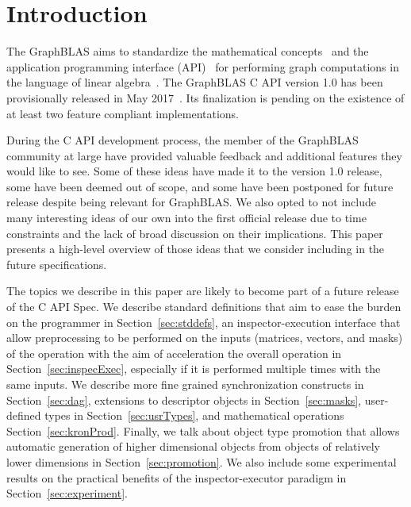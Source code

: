 %
%
\section{Introduction}
\label{sec:intro}
The GraphBLAS aims to standardize the mathematical concepts~\cite{mathgraphblas16} and the application programming interface (API)~\cite{graphblas_capi_17} for performing graph computations in the language of linear algebra~\cite{kepner2011graph}. The GraphBLAS C API version 1.0 has been provisionally released in May 2017~\cite{graphblasapi}. Its finalization is pending on the existence of at least two feature compliant implementations. 

During the C API development process, the member of the GraphBLAS community at large have provided valuable feedback and additional features they would like to see. Some of these ideas have made it to the version 1.0 release, some have been deemed out of scope, and some have been postponed for future release despite being relevant for GraphBLAS. We also opted to not include many interesting ideas of our own into the first official release due to time constraints and the lack of broad discussion on their implications. This paper presents a high-level overview of those ideas that we consider including in the future specifications.

The topics we describe in this paper are likely to become part of a future release of the C API Spec. We describe standard definitions that aim to ease the burden on the programmer in Section~\ref{sec:stddefs}, an inspector-execution interface that allow preprocessing to be performed on the inputs (matrices, vectors, and masks) of the operation with the aim of acceleration the overall operation in Section~\ref{sec:inspecExec}, especially if it is performed multiple times with the same inputs.
We describe more fine grained synchronization constructs in Section~\ref{sec:dag}, extensions to descriptor objects in Section~\ref{sec:masks}, user-defined types in Section~\ref{sec:usrTypes}, and mathematical operations Section~\ref{sec:kronProd}. Finally, we talk about object type promotion that allows automatic generation of higher dimensional objects from objects of relatively lower dimensions in Section~\ref{sec:promotion}. We also include some experimental results on the practical benefits of the inspector-executor paradigm in Section~\ref{sec:experiment}. 

